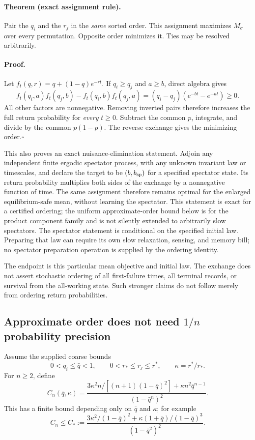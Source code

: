 \paragraph{Theorem (exact assignment rule).}
Pair the $q_i$ and the $r_j$ in the \emph{same} sorted order.  This
assignment maximizes $M_\sigma$ over every permutation.  Opposite order
minimizes it.  Ties may be resolved arbitrarily.

\paragraph{Proof.}
Let $f_t(q,r)=q+(1-q)e^{-rt}$.  If $q_i\ge q_j$ and $a\ge b$, direct
algebra gives
\begin{equation}
 f_t(q_i,a)f_t(q_j,b)-f_t(q_i,b)f_t(q_j,a)
   =(q_i-q_j)(e^{-bt}-e^{-at})\ge0.
 \label{eq:sortswap}
\end{equation}
All other factors are nonnegative.  Removing inverted pairs therefore
increases the full return probability for \emph{every} $t\ge0$.
Subtract the common $p$, integrate, and divide by the common $p(1-p)$.
The reverse exchange gives the minimizing order.\hfill$\square$

This also proves an exact nuisance-elimination statement.  Adjoin any
independent finite ergodic spectator process, with any unknown invariant
law or timescales, and declare the target to be $(b,b_{\rm sp})$ for a
specified spectator state.  Its return probability multiplies both sides
of the exchange by a nonnegative function of time.  The same assignment
therefore remains optimal for the enlarged equilibrium-safe mean, without
learning the spectator.  This statement is exact for a certified ordering;
the uniform approximate-order bound below is for the product component
family and is not silently extended to arbitrarily slow spectators.
The spectator statement is conditional on the specified initial law.
Preparing that law can require its own slow relaxation, sensing, and
memory bill; no spectator preparation operation is supplied by the
ordering identity.

The endpoint is this particular mean objective and initial law.  The
exchange does not assert stochastic ordering of all first-failure times,
all terminal records, or survival from the all-working state.  Such stronger
claims do not follow merely from ordering return probabilities.

\subsection{Approximate order does not need $1/n$ probability precision}
Assume the supplied coarse bounds
\[
 0<q_i\le\bar q<1,\qquad
 0<r_*\le r_j\le r^*,\qquad \kappa=r^*/r_*.
\]
For $n\ge2$, define
\begin{equation}
 C_n(\bar q,\kappa)=
 \frac{3\kappa^2 n/[(n+1)(1-\bar q)^2]
          +\kappa n^2\bar q^{n-1}}
      {(1-\bar q^n)^2}.
 \label{eq:sortingconstant}
\end{equation}
This has a finite bound depending only on $\bar q$ and $\kappa$; for
example
\[
 C_n\le C_*:=
 \frac{3\kappa^2/(1-\bar q)^2
       +\kappa(1+\bar q)/(1-\bar q)^3}
      {(1-\bar q^2)^2}.
\]

